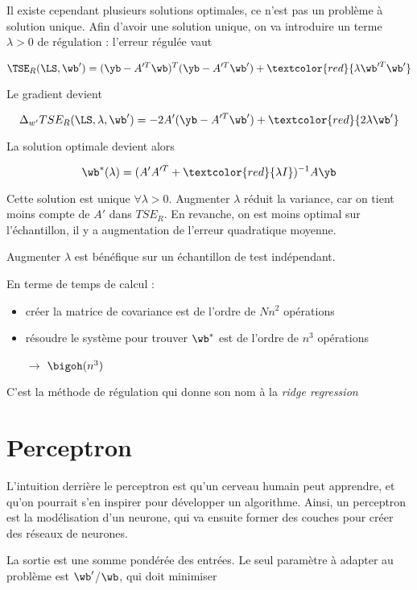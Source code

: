 		
	Il existe cependant plusieurs solutions optimales, ce n'est pas un problème à solution unique. Afin d'avoir une solution unique, on va introduire un terme $\lambda > 0$ de régulation : l'erreur régulée vaut
	
	$$\TSE_R(\LS, \wb') = (\yb - A'^T\wb)^T(\yb - A'^T\wb') + \textcolor{red}{\lambda \wb'^T\wb'}$$
	
	Le gradient devient
	
	$$\Delta_{w'} TSE_R(\LS, \lambda, \wb') = -2 A' (\yb - A'^T\wb') + \textcolor{red}{2 \lambda \wb'}$$
	
	La solution optimale devient alors
	
	$$\wb^*(\lambda) = (A' A'^T + \textcolor{red}{\lambda I})^{-1} A \yb$$
	
	Cette solution est unique $\forall \lambda > 0$. Augmenter $\lambda$ réduit la variance, car on tient moins compte de $A'$ dans $TSE_R$. En revanche, on est moins optimal sur l'échantillon, il y a augmentation de l'erreur quadratique moyenne.
		
		
	Augmenter $\lambda$ est bénéfique sur un échantillon de test indépendant.
	
	En terme de temps de calcul :
	
	\begin{itemize}
		\item créer la matrice de covariance est de l'ordre de $N n^2$ opérations
		\item résoudre le système pour trouver $\wb^*$ est de l'ordre de $n^3$ opérations
		\item[$\rightarrow$] $\bigoh(n^3)$
	\end{itemize}
	
	
	C'est la méthode de régulation qui donne son nom à la \textit{ridge regression}
	
	
\section{Perceptron}
	
L'intuition derrière le perceptron est qu'un cerveau humain peut apprendre, et qu'on pourrait s'en inspirer pour développer un algorithme. Ainsi, un perceptron est la modélisation d'un neurone, qui va ensuite former des couches pour créer des réseaux de neurones.
	
	
La sortie est une somme pondérée des entrées. Le seul paramètre à adapter au problème est $\wb'$/$\wb$, qui doit minimiser
	
